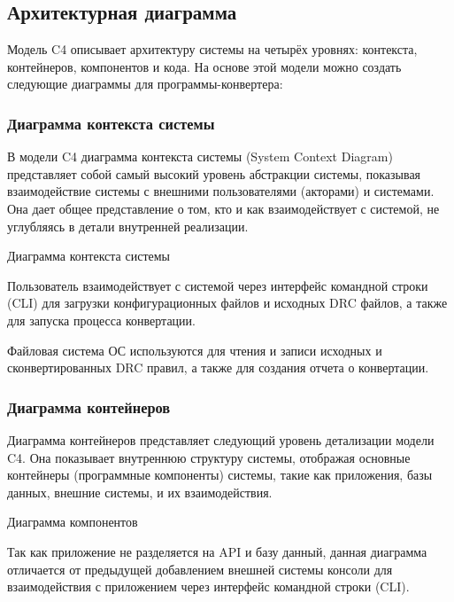 \subsection{Архитектурная диаграмма}

Модель C4 описывает архитектуру системы на четырёх уровнях:
контекста, контейнеров, компонентов и кода.
На основе этой модели можно создать следующие диаграммы
для программы-конвертера:

\subsubsection{Диаграмма контекста системы}

В модели C4 диаграмма контекста системы (System Context Diagram)
представляет собой самый высокий уровень абстракции системы,
показывая взаимодействие системы с внешними пользователями (акторами)
и системами. Она дает общее представление о том,
кто и как взаимодействует с системой,
не углубляясь в детали внутренней реализации.
   
\begin{image}
	\caption{Диаграмма контекста системы}
	\label{fig:c4:system:context}
\end{image}

Пользователь взаимодействует с системой через интерфейс командной строки (CLI)
для загрузки конфигурационных файлов и исходных DRC файлов,
а также для запуска процесса конвертации.\par
Файловая система ОС используются для чтения и записи исходных
и сконвертированных DRC правил, а также для создания отчета о конвертации.

\subsubsection{Диаграмма контейнеров}

Диаграмма контейнеров представляет следующий уровень детализации модели C4.
Она показывает внутреннюю структуру системы,
отображая основные контейнеры (программные компоненты) системы,
такие как приложения, базы данных, внешние системы, и их взаимодействия.
   
\begin{image}
	\caption{Диаграмма компонентов}
	\label{fig:c4:container}
\end{image}

Так как приложение не разделяется на API и базу данный,
данная диаграмма отличается от предыдущей добавлением внешней системы
консоли для взаимодействия с приложением
через интерфейс командной строки (CLI).

